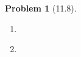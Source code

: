 \documentclass[12pt]{article}
\theoremstyle{definition}
\newtheorem{problem}{Problem}
\begin{document}
\begin{problem}[11.8]
    \begin{enumerate}[label=(\alph*)]
        \item 
        \begin{solution}

        \end{solution}

        \item 
        \begin{solution}

        \end{solution}
    \end{enumerate}
\end{problem}
\end{document}
